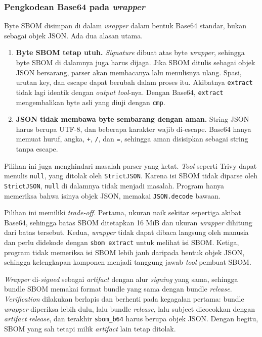 \subsubsection*{Pengkodean Base64 pada \textit{wrapper}}
Byte SBOM disimpan di dalam \textit{wrapper} dalam bentuk Base64 standar, bukan sebagai objek JSON. Ada dua alasan utama.

\begin{enumerate}
  \item \textbf{Byte SBOM tetap utuh.} \textit{Signature} dibuat atas byte \textit{wrapper}, sehingga
    byte SBOM di dalamnya juga harus dijaga. Jika SBOM ditulis sebagai objek JSON bersarang,
    parser akan membacanya lalu menulisnya ulang. Spasi, urutan key, dan escape dapat berubah
    dalam proses itu. Akibatnya \texttt{extract} tidak lagi identik dengan \textit{output} \textit{tool}-nya.
    Dengan Base64, \texttt{extract} mengembalikan byte asli yang diuji dengan \texttt{cmp}.
  \item \textbf{JSON tidak membawa byte sembarang dengan aman.} String JSON harus berupa UTF-8,
    dan beberapa karakter wajib di-escape. Base64 hanya memuat huruf, angka, \texttt{+}, \texttt{/},
    dan \texttt{=}, sehingga aman disisipkan sebagai string tanpa escape.
\end{enumerate}

Pilihan ini juga menghindari masalah parser yang ketat. \textit{Tool} seperti Trivy dapat menulis
\texttt{null}, yang ditolak oleh \texttt{StrictJSON}. Karena isi SBOM tidak diparse oleh
\texttt{StrictJSON}, \texttt{null} di dalamnya tidak menjadi masalah. Program hanya memeriksa
bahwa isinya objek JSON, memakai \texttt{JSON.decode} bawaan.

Pilihan ini memiliki \textit{trade-off}. Pertama, ukuran naik sekitar sepertiga akibat Base64,
sehingga batas SBOM ditetapkan 16 MiB dan ukuran \textit{wrapper} dihitung dari batas tersebut.
Kedua, \textit{wrapper} tidak dapat dibaca langsung oleh manusia dan perlu didekode dengan
\texttt{sbom extract} untuk melihat isi SBOM. Ketiga, program tidak memeriksa isi SBOM lebih
jauh daripada bentuk objek JSON, sehingga kelengkapan komponen menjadi tanggung jawab \textit{tool}
pembuat SBOM.

\textit{Wrapper} di-\textit{signed} sebagai \textit{artifact} dengan alur \textit{signing} yang sama, sehingga
bundle SBOM memakai format bundle yang sama dengan bundle \textit{release}. \textit{Verification} dilakukan berlapis dan
berhenti pada kegagalan pertama: bundle \textit{wrapper} diperiksa lebih dulu, lalu bundle \textit{release},
lalu subject dicocokkan dengan \textit{artifact} \textit{release}, dan terakhir \texttt{sbom\_b64} harus berupa
objek JSON. Dengan begitu, SBOM yang sah tetapi milik \textit{artifact} lain tetap ditolak.

